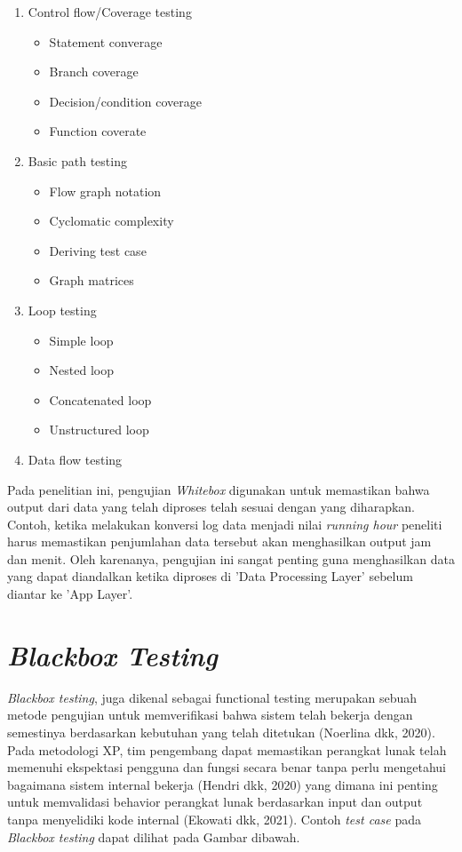 \begin{enumerate}
    \item Control flow/Coverage testing
    \begin{itemize}
        \item Statement converage
        \item Branch coverage
        \item Decision/condition coverage
        \item Function coverate
    \end{itemize}

    \item Basic path testing
    \begin{itemize}
        \item Flow graph notation
        \item Cyclomatic complexity
        \item Deriving test case
        \item Graph matrices
    \end{itemize}

    \item Loop testing
    \begin{itemize}
        \item Simple loop
        \item Nested loop
        \item Concatenated loop
        \item Unstructured loop
    \end{itemize}

    \item Data flow testing
\end{enumerate}

Pada penelitian ini, pengujian \textit{Whitebox} digunakan untuk memastikan bahwa output dari data yang telah diproses telah sesuai dengan yang diharapkan. Contoh, ketika melakukan konversi log data menjadi nilai \textit{running hour} peneliti harus memastikan penjumlahan data tersebut akan menghasilkan output jam dan menit. Oleh karenanya, pengujian ini sangat penting guna menghasilkan data yang dapat diandalkan ketika diproses di 'Data Processing Layer' sebelum diantar ke 'App Layer'.

\section{\textit{Blackbox Testing}}
\textit{Blackbox testing}, juga dikenal sebagai functional testing merupakan sebuah metode pengujian untuk memverifikasi bahwa sistem telah bekerja dengan semestinya berdasarkan kebutuhan yang telah ditetukan (Noerlina dkk, 2020). Pada metodologi XP, tim pengembang dapat memastikan perangkat lunak telah memenuhi ekspektasi pengguna dan fungsi secara benar tanpa perlu mengetahui bagaimana sistem internal bekerja (Hendri dkk, 2020) yang dimana ini penting untuk memvalidasi behavior perangkat lunak berdasarkan input dan output tanpa menyelidiki kode internal (Ekowati dkk, 2021). Contoh \textit{test case} pada \textit{Blackbox testing} dapat dilihat pada Gambar dibawah.

